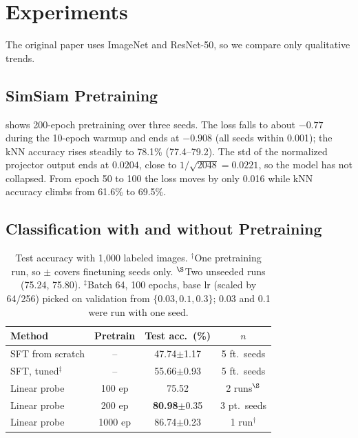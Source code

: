 \documentclass[10pt,twocolumn,letterpaper]{article}
\newcommand{\pmstd}[1]{{\scriptsize$\pm$#1}}
\begin{document}
\section{Experiments}
\label{sec:exp}

The original paper uses ImageNet and ResNet-50, so we compare only qualitative trends.


\subsection{SimSiam Pretraining}
\label{sec:exp_pretrain}



 shows 200-epoch pretraining over three seeds.
The loss falls to about $-0.77$ during the 10-epoch warmup and ends at $-0.908$ (all seeds within 0.001); the kNN accuracy rises steadily to 78.1\% (77.4--79.2).
The std of the normalized projector output ends at $0.0204$, close to $1/\sqrt{2048}=0.0221$, so the model has not collapsed.
From epoch 50 to 100 the loss moves by only 0.016 while kNN accuracy climbs from 61.6\% to 69.5\%.

\subsection{Classification with and without Pretraining}
\label{sec:exp_cls}



\begin{table}[t]
\centering
\small
\setlength\tabcolsep{4pt}
\begin{tabular}{lccc}
\toprule
Method & Pretrain & Test acc.\ (\%) & $n$ \\
\midrule
SFT from scratch & -- & 47.74\pmstd{1.17} & 5 ft.\ seeds \\
SFT, tuned$^\ddagger$ & -- & 55.66\pmstd{0.93} & 5 ft.\ seeds \\
Linear probe & 100 ep & 75.52 & 2 runs$^\S$ \\
Linear probe & 200 ep & \textbf{80.98}\pmstd{0.35} & 3 pt.\ seeds \\
Linear probe & 1000 ep & 86.74\pmstd{0.23} & 1 run$^\dagger$ \\
\bottomrule
\end{tabular}
\caption{Test accuracy with 1,000 labeled images. $^\dagger$One pretraining run, so $\pm$ covers finetuning seeds only. $^\S$Two unseeded runs (75.24, 75.80). $^\ddagger$Batch 64, 100 epochs, base lr (scaled by 64/256) picked on validation from $\{0.03,0.1,0.3\}$; 0.03 and 0.1 were run with one seed.}
\label{tab:cls}
\end{table}
\end{document}

